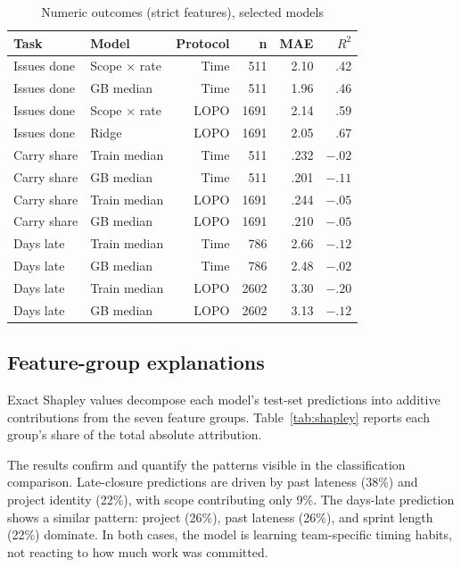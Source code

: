 \documentclass[conference]{IEEEtran}
\begin{document}
\begin{table}[!htb]
\centering\scriptsize
\caption{Numeric outcomes (strict features), selected models}
\label{tab:numeric}
\setlength{\tabcolsep}{2.0pt}
\begin{tabular}{@{}llrrrr@{}}
\toprule
Task & Model & Protocol & n & MAE & $R^2$\\
\midrule
Issues done & Scope $\times$ rate & Time & 511 & 2.10 & .42\\
Issues done & GB median & Time & 511 & 1.96 & .46\\
Issues done & Scope $\times$ rate & LOPO & 1691 & 2.14 & .59\\
Issues done & Ridge & LOPO & 1691 & 2.05 & .67\\
\midrule
Carry share & Train median & Time & 511 & .232 & $-.02$\\
Carry share & GB median & Time & 511 & .201 & $-.11$\\
Carry share & Train median & LOPO & 1691 & .244 & $-.05$\\
Carry share & GB median & LOPO & 1691 & .210 & $-.05$\\
\midrule
Days late & Train median & Time & 786 & 2.66 & $-.12$\\
Days late & GB median & Time & 786 & 2.48 & $-.02$\\
Days late & Train median & LOPO & 2602 & 3.30 & $-.20$\\
Days late & GB median & LOPO & 2602 & 3.13 & $-.12$\\
\bottomrule
\end{tabular}
\end{table}

\subsection{Feature-group explanations}

Exact Shapley values decompose each model's test-set predictions into additive contributions from the seven feature groups.
Table~\ref{tab:shapley} reports each group's share of the total absolute attribution.

The results confirm and quantify the patterns visible in the classification comparison.
Late-closure predictions are driven by past lateness (38\%) and project identity (22\%), with scope contributing only 9\%.
The days-late prediction shows a similar pattern: project (26\%), past lateness (26\%), and sprint length (22\%) dominate.
In both cases, the model is learning team-specific timing habits, not reacting to how much work was committed.
\end{document}
